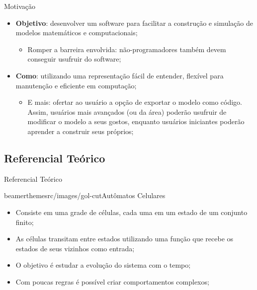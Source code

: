 \begin{frame}{Motivação}
    \begin{itemize}
        \item \textbf{Objetivo}: desenvolver um software para facilitar a construção e simulação de modelos matemáticos e computacionais;
        \begin{itemize}
            \item Romper a barreira envolvida: não-programadores também devem conseguir usufruir do software;
        \end{itemize}
        \item \textbf{Como}: utilizando uma representação fácil de entender, flexível para manutenção e eficiente em computação;
        \begin{itemize}
            \item E mais: ofertar ao usuário a opção de exportar o modelo como código. Assim, usuários mais avançados (ou da área) poderão usufruir de modificar o modelo a seus gostos, enquanto usuários iniciantes poderão aprender a construir seus próprios;
        \end{itemize}
    \end{itemize}
\end{frame}


\subsection{Referencial Teórico}

\begin{chapter}{}{Referencial Teórico}
\end{chapter}

\begin{sidepic}{beamerthemesrc/images/gol-cut}{Autômatos Celulares}
   \begin{itemize}
       \item Consiste em uma grade de células, cada uma em um estado de um conjunto finito;
        \item As células transitam entre estados utilizando uma função que recebe os estados de seus vizinhos como entrada;
        \item O objetivo é estudar a evolução do sistema com o tempo;
        \item Com poucas regras é possível criar comportamentos complexos;
    \end{itemize}
\end{sidepic}

